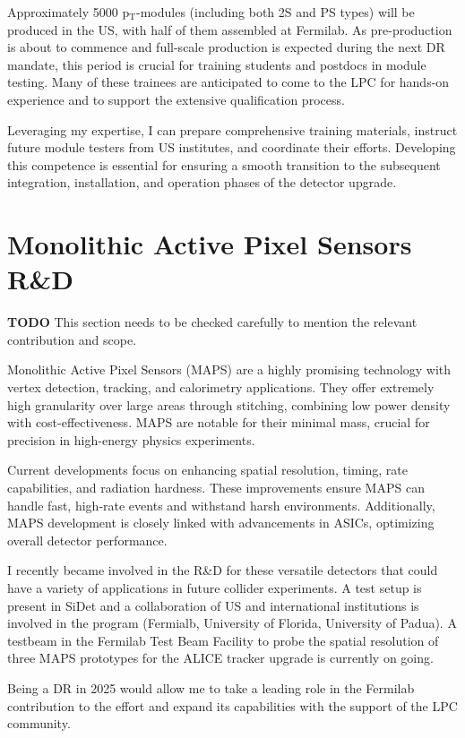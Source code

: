 {\begin{flushleft}
Approximately 5000 p$_{\mathrm{T}}$-modules (including both 2S and PS types) will be produced in the US, with half of them assembled at Fermilab. As pre-production is about to commence and full-scale production is expected during the next DR mandate, this period is crucial for training students and postdocs in module testing. Many of these trainees are anticipated to come to the LPC for hands-on experience and to support the extensive qualification process.

Leveraging my expertise, I can prepare comprehensive training materials, instruct future module testers from US institutes, and coordinate their efforts. Developing this competence is essential for ensuring a smooth transition to the subsequent integration, installation, and operation phases of the detector upgrade.

\vspace{\baselineskip}
\section{Monolithic Active Pixel Sensors R\&D}
{\bf TODO} This section needs to be checked carefully to mention the relevant contribution and scope.

Monolithic Active Pixel Sensors (MAPS) are a highly promising technology with vertex detection, tracking, and calorimetry applications. They offer extremely high granularity over large areas through stitching, combining low power density with cost-effectiveness. MAPS are notable for their minimal mass, crucial for precision in high-energy physics experiments.

Current developments focus on enhancing spatial resolution, timing, rate capabilities, and radiation hardness. These improvements ensure MAPS can handle fast, high-rate events and withstand harsh environments. Additionally, MAPS development is closely linked with advancements in ASICs, optimizing overall detector performance.

I recently became involved in the R\&D for these versatile detectors that could have a variety of applications in future collider experiments. A test setup is present in SiDet and a collaboration of US and international institutions is involved in the program (Fermialb, University of Florida, University of Padua). A testbeam in the Fermilab Test Beam Facility to probe the spatial resolution of three MAPS prototypes for the ALICE tracker upgrade is currently on going. 

Being a DR in 2025 would allow me to take a leading role in the Fermilab contribution to the effort and expand its capabilities with the support of the LPC community.



\end{flushleft}}
